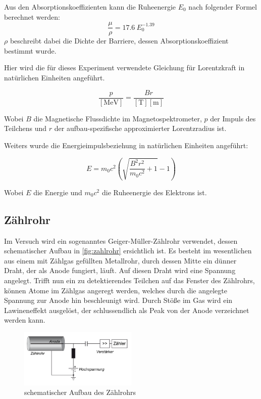 \documentclass[12pt,english,ngerman]{scrartcl}
\begin{document}
Aus den Absorptionskoeffizienten kann die Ruheenergie \(E_0\) nach folgender
Formel berechnet werden:
\begin{equation}
	\frac{\mu}{\rho} = 17.6 \ E_0^{-1.39}
	\label{eq:Endpunktsenergie}
\end{equation}
\(\rho\) beschreibt dabei die Dichte der Barriere, dessen
Absorptionskoeffizient bestimmt wurde.~\cite{kuchling}

Hier wird die für dieses Experiment verwendete Gleichung für Lorentzkraft in
natürlichen Einheiten angeführt.

\begin{equation}
	\frac{p}{[\si{\mega\electronvolt}]} =  \frac{Br}{[\si{\tesla}][\si{\meter}]}
	\label{eq:lorentzimpuls}
\end{equation}

Wobei $B$ die Magnetische Flussdichte im Magnetospektrometer, $p$ der Impuls
des Teilchens und $r$ der aufbau-spezifische approximierter Lorentzradius ist.

Weiters wurde die Energieimpulsbeziehung in natürlichen Einheiten angeführt:

\begin{equation}
	E = m_0 c^2 \left(\sqrt{\frac{ B^{2} r^{2}}{m_0 c^2} + 1} - 1 \right)
	\label{eq:energieimpulsrelation}
\end{equation}

Wobei $E$ die Energie und $m_0 c^2$ die Ruheenergie des Elektrons ist.

\subsection{Zählrohr}

Im Versuch wird ein sogenanntes Geiger-Müller-Zählrohr verwendet, dessen
schematischer Aufbau in \autoref{fig:zahlrohr} ersichtlich ist. Es besteht im
wesentlichen aus einem mit Zählgas gefüllten Metallrohr, durch dessen Mitte ein
dünner Draht, der als Anode fungiert, läuft. Auf diesen Draht wird eine
Spannung angelegt. Trifft nun ein zu detektierendes Teilchen auf das Fenster
des Zählrohrs, können Atome im Zählgas angeregt werden, welches durch die
angelegte Spannung zur Anode hin beschleunigt wird. Durch Stöße im Gas wird ein
Lawineneffekt ausgelöst, der schlussendlich als Peak von der Anode verzeichnet
werden kann.

\begin{figure}[H]
	\begin{center}
		\includegraphics[width = 0.5\textwidth]{./figures/zahlrohr.png}
	\end{center}
	\caption{schematischer Aufbau des Zählrohrs~\cite[]{zaehlrohrvorbereitung}}\label{fig:zahlrohr}
\end{figure}
\end{document}
